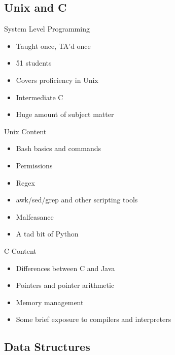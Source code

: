 \documentclass[11pt]{beamer}
\begin{document}
\subsection{Unix and C}

\begin{frame}{System Level Programming}
	\begin{itemize}
		\item Taught once, TA'd once
		\item 51 students
		\item Covers proficiency in Unix
		\item Intermediate C
		\item Huge amount of subject matter
	\end{itemize}
\end{frame}

\begin{frame}{Unix Content}
	\begin{itemize}
		\item Bash basics and commands
		\item Permissions
		\item Regex
		\item awk/sed/grep and other scripting tools
		\item Malfeasance
		\item A tad bit of Python
		
	\end{itemize}
	
\end{frame}

\begin{frame}{C Content}
	\begin{itemize}
		\item Differences between C and Java
		\item Pointers and pointer arithmetic
		\item Memory management
		\item Some brief exposure to compilers and interpreters
	\end{itemize}
	
\end{frame}

\subsection{Data Structures}
\end{document}
